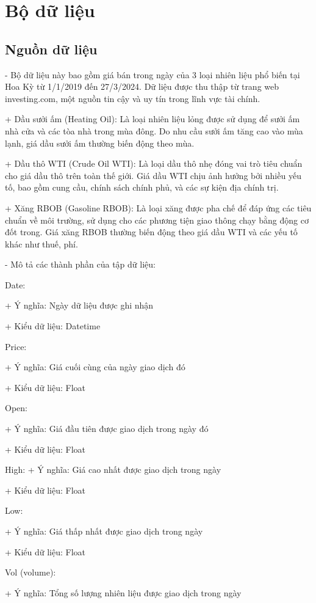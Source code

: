 \documentclass[conference]{IEEEtran}
\begin{document}
\section{Bộ dữ liệu}

\subsection{Nguồn dữ liệu}

- Bộ dữ liệu này bao gồm giá bán trong ngày của 3 loại nhiên liệu phổ biến tại Hoa Kỳ từ 1/1/2019 đến 27/3/2024. Dữ liệu được thu thập từ trang web investing.com, một nguồn tin cậy và uy tín trong lĩnh vực tài chính.

+ Dầu sưởi ấm (Heating Oil): Là loại nhiên liệu lỏng được sử dụng để sưởi ấm nhà cửa và các tòa nhà trong mùa đông. Do nhu cầu sưởi ấm tăng cao vào mùa lạnh, giá dầu sưởi ấm thường biến động theo mùa.

+ Dầu thô WTI (Crude Oil WTI): Là loại dầu thô nhẹ đóng vai trò tiêu chuẩn cho giá dầu thô trên toàn thế giới. Giá dầu WTI chịu ảnh hưởng bởi nhiều yếu tố, bao gồm cung cầu, chính sách chính phủ, và các sự kiện địa chính trị.

+ Xăng RBOB (Gasoline RBOB): Là loại xăng được pha chế để đáp ứng các tiêu chuẩn về môi trường, sử dụng cho các phương tiện giao thông chạy bằng động cơ đốt trong. Giá xăng RBOB thường biến động theo giá dầu WTI và các yếu tố khác như thuế, phí.

- Mô tả các thành phần của tập dữ liệu:

Date:

+ Ý nghĩa: Ngày dữ liệu được ghi nhận

+ Kiểu dữ liệu: Datetime

Price:

+ Ý nghĩa: Giá cuối cùng của ngày giao dịch đó

+ Kiểu dữ liệu: Float

Open:

+ Ý nghĩa: Giá đầu tiên được giao dịch trong ngày đó

+ Kiểu dữ liệu: Float

High:
+ Ý nghĩa: Giá cao nhất được giao dịch trong ngày

+ Kiểu dữ liệu: Float

Low:

+ Ý nghĩa: Giá thấp nhất được giao dịch trong ngày

+ Kiểu dữ liệu: Float

Vol (volume):

+ Ý nghĩa: Tổng số lượng nhiên liệu được giao dịch trong ngày
\end{document}
